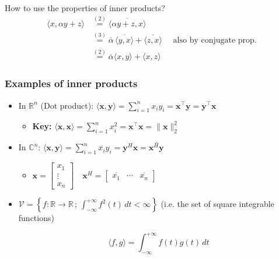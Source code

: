 \begin{example} How to use the properties of inner products?
    \begin{align*}
        \langle x, \alpha y + z \rangle &\overset{(2)}= \overline{\langle \alpha y + z, x \rangle} \\
        &\overset{(3)}{=} \overline{\alpha} \, \overline{\langle y, x \rangle} + \overline{\langle z, x \rangle} \quad \text{ also by conjugate prop.}\\
        &\overset{(2)}{=} \overline{\alpha} \langle x, y \rangle + \langle x, z \rangle
    \end{align*}
\end{example}

\subsubsection{Examples of inner products}
\begin{example}
    \begin{itemize}
        \item In \( \mathbb{R}^n \) (Dot product): $\langle \mathbf{x}, \mathbf{y} \rangle = \sum_{i=1}^{n} x_i y_i = \mathbf{x}^\top \mathbf{y}=\mathbf{y}^\top \mathbf{x}$
        \begin{itemize}
            \item \textbf{Key:} $\langle \mathbf{x}, \mathbf{x} \rangle = \sum_{i=1}^{n} x_i^2 = \mathbf{x}^\top \mathbf{x} = \lVert \mathbf{x} \rVert_2^2$ 
        \end{itemize}
        \item In \( \mathbb{C}^n \): $\langle \mathbf{x}, \mathbf{y} \rangle = \sum_{i=1}^{n} \overline{x_i} y_i = \mathbf{y}^H \mathbf{x} = \overline{\mathbf{x}^H \mathbf{y}}$
        \begin{itemize}
            \item $
                \mathbf{x} = \begin{bmatrix}
                x_1 \\
                \vdots \\
                x_n
                \end{bmatrix}
                \quad
                \mathbf{x}^H = \begin{bmatrix}
                \overline{x_1} & \cdots & \overline{x_n}
                \end{bmatrix}
                $
        \end{itemize}
        \item $\mathcal{V} = \left\{ f : \mathbb{R} \to \mathbb{R} \, ; \, \int_{-\infty}^{+\infty} f^2(t) \, dt < \infty \right\}$ (i.e. the set of square integrable functions)

        \[
        \langle f, g \rangle = \int_{-\infty}^{+\infty} f(t) g(t) \, dt
        \]

    \end{itemize}
\end{example}

